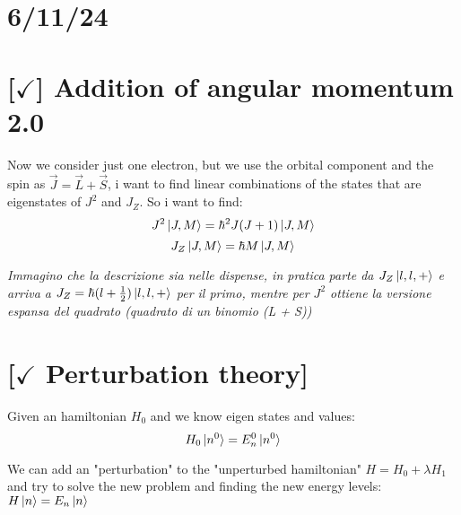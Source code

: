 \section{6/11/24}

\section{[$\checkmark$] Addition of angular momentum 2.0}

Now we consider just one electron, but we use the orbital component and the spin as $\vec{J} = \vec{L} + \vec{S}$, i want to find linear combinations of the states that are eigenstates of $J^2$ and $J_Z$. So i want to find: $$J^2\ket{J, M} = \hbar^2 J(J+1)\ket{J,M}$$ $$J_Z\ket{J,M}=\hbar M \ket{J,M}$$

\textit{Immagino che la descrizione sia nelle dispense, in pratica parte da $J_Z \ket{l,l,+}$ e arriva a $J_Z=\hbar(l+\frac{1}{2})\ket{l,l,+}$ per il primo, mentre per $J^2$ ottiene la versione espansa del quadrato (quadrato di un binomio (L + S))}

\section{[$\checkmark$ Perturbation theory]}

Given an hamiltonian $H_0$ and we know eigen states and values: $$H_0 \ket{n^0} = E^0_n\ket{n^0}$$

We can add an "perturbation" to the "unperturbed hamiltonian" $H = H_0 + \lambda H_1$ and try to solve the new problem and finding the new energy levels: $H\ket{n} = E_n\ket{n}$